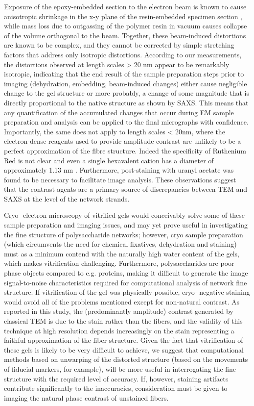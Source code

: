 Exposure of the epoxy-embedded section to the electron beam is known to cause anisotropic shrinkage in the x-y plane of the resin-embedded specimen section \cite{luther_sample_2007}, while mass loss due to outgassing of the polymer resin in vacuum causes collapse of the volume orthogonal to the beam. Together, these beam-induced distortions are known to be complex, and they cannot be corrected by simple stretching factors that address only isotropic distortions. According to our measurements, the distortions observed at length scales > 20 nm appear to be remarkably isotropic, indicating that the end result of the sample preparation steps prior to imaging (dehydration, embedding, beam-induced changes) either cause negligible change to the gel structure or more probably, a change of some magnitude that is directly proportional to the native structure as shown by SAXS. This means that any quantification of the accumulated changes that occur during EM sample preparation and analysis can be applied to the final micrographs with confidence. Importantly, the same does not apply to length scales < 20nm, where the electron-dense reagents used to provide amplitude contrast are unlikely to be a perfect approximation of the fibre structure. Indeed the specificity of Ruthenium Red is not clear and even a single hexavalent cation has a diameter of approximately 1.13 nm \cite{chaffey_principles_2001}. Furthermore, post-staining with uranyl acetate was found to be necessary to facilitate image analysis. These observations suggest that the contrast agents are a primary source of discrepancies between TEM and SAXS at the level of the network strands.

Cryo- electron microscopy of vitrified gels would conceivably solve some of these sample preparation and imaging issues, and may yet prove useful in investigating the fine structure of polysaccharide networks; however, cryo sample preparation (which circumvents the need for chemical fixatives, dehydration and staining) must as a minimum contend with the naturally high water content of the gels, which makes vitrification challenging. Furthermore, polysaccharides are poor phase objects compared to e.g. proteins, making it difficult to generate the image signal-to-noise characteristics required for computational analysis of network fine structure. If vitrification of the gel was physically possible, cryo- negative staining would avoid all of the problems mentioned except for non-natural contrast. As reported in this study, the (predominantly amplitude) contrast generated by classical TEM is due to the stain rather than the fibers, and the validity of this technique at high resolution depends increasingly on the stain representing a faithful approximation of the fiber structure. Given the fact that vitrification of these gels is likely to be very difficult to achieve, we suggest that computational methods based on unwarping of the distorted structure (based on the movements of fiducial markers, for example), will be more useful in interrogating the fine structure with the required level of accuracy. If, however, staining artifacts contribute significantly to the inaccuracies, consideration must be given to imaging the natural phase contrast of unstained fibers.

